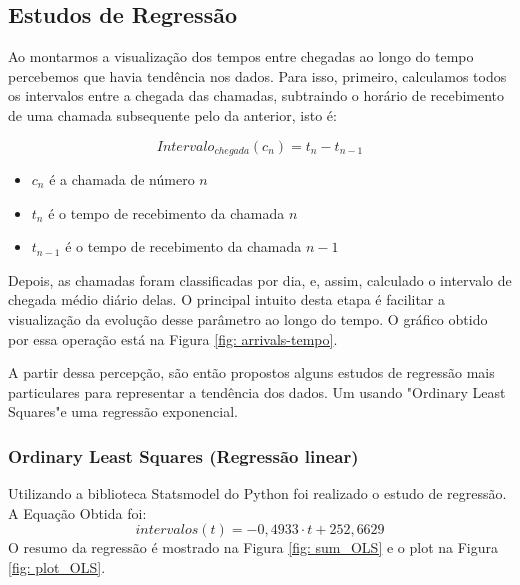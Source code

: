 \subsection{Estudos de Regressão}

Ao montarmos a visualização dos tempos entre chegadas ao longo do tempo percebemos que havia tendência nos dados. Para isso, primeiro, calculamos todos os intervalos entre a chegada das chamadas, subtraindo o horário de recebimento de uma chamada subsequente pelo da anterior, isto é:

$$Intervalo_{chegada}(c_n) = t_n - t_{n-1}$$ 

\begin{itemize}
    \item $c_n$ é a chamada de número $n$
    \item $t_n$ é o tempo de recebimento da chamada $n$
    \item $t_{n-1}$ é o tempo de recebimento da chamada $n-1$
\end{itemize}

Depois, as chamadas foram classificadas por dia, e, assim, calculado o intervalo de chegada médio diário delas. O principal intuito desta etapa é facilitar a visualização da evolução desse parâmetro ao longo do tempo. O gráfico obtido por essa operação está na Figura \ref*{fig: arrivals-tempo}.

A partir dessa percepção, são então propostos alguns estudos de regressão mais particulares para representar a tendência dos dados. Um usando "Ordinary Least Squares"\;e uma regressão exponencial.  

\subsubsection{Ordinary Least Squares (Regressão linear)}

Utilizando a biblioteca Statsmodel do Python foi realizado o estudo de regressão. A Equação Obtida foi: $$intervalos(t) = -0,4933 \cdot t + 252,6629$$ O resumo da regressão é mostrado na Figura \ref*{fig: sum_OLS} e o plot na Figura \ref*{fig: plot_OLS}.

